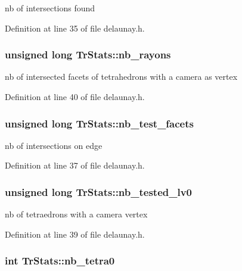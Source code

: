 nb of intersections found 



Definition at line 35 of file delaunay.h.

\hypertarget{classTrStats_a8bdc211d4e6e25d9f1c0c00a7d35faf9}{
\subsubsection[{nb\_\-rayons}]{\setlength{\rightskip}{0pt plus 5cm}unsigned long {\bf TrStats::nb\_\-rayons}}}
\label{classTrStats_a8bdc211d4e6e25d9f1c0c00a7d35faf9}


nb of intersected facets of tetrahedrons with a camera as vertex 



Definition at line 40 of file delaunay.h.

\hypertarget{classTrStats_aa6d678657deb3ddb2723ef804ca3c7c6}{
\subsubsection[{nb\_\-test\_\-facets}]{\setlength{\rightskip}{0pt plus 5cm}unsigned long {\bf TrStats::nb\_\-test\_\-facets}}}
\label{classTrStats_aa6d678657deb3ddb2723ef804ca3c7c6}


nb of intersections on edge 



Definition at line 37 of file delaunay.h.

\hypertarget{classTrStats_a0f7b2ad9c9363b68608cbcec16c82af3}{
\subsubsection[{nb\_\-tested\_\-lv0}]{\setlength{\rightskip}{0pt plus 5cm}unsigned long {\bf TrStats::nb\_\-tested\_\-lv0}}}
\label{classTrStats_a0f7b2ad9c9363b68608cbcec16c82af3}


nb of tetraedrons with a camera vertex 



Definition at line 39 of file delaunay.h.

\hypertarget{classTrStats_a50445249236e80915c7d3cc9556c53b5}{
\subsubsection[{nb\_\-tetra0}]{\setlength{\rightskip}{0pt plus 5cm}int {\bf TrStats::nb\_\-tetra0}}}
\label{classTrStats_a50445249236e80915c7d3cc9556c53b5}


